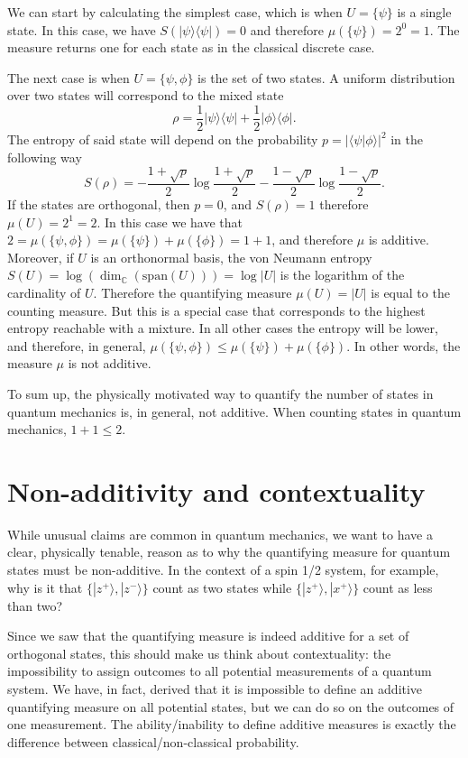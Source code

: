 \documentclass[entropy,article,submit,pdftex,moreauthors]{Definitions/mdpi}
\def\>{\rangle}
\def\<{\langle}
\begin{document}
We can start by calculating the simplest case, which is when $U = \{ \psi \}$ is a single state. In this case, we have $S(|\psi\>\<\psi|) = 0$ and therefore $\mu(\{\psi\}) = 2^{0} = 1$. The measure returns one for each state as in the classical discrete case.

The next case is when $U = \{ \psi, \phi \}$ is the set of two states. A uniform distribution over two states will correspond to the mixed state
\begin{equation}
	\rho = \frac{1}{2} |\psi\>\<\psi| + \frac{1}{2} |\phi\>\<\phi|.
\end{equation}
The entropy of said state will depend on the probability $p=|\<\psi | \phi \>|^2$ in the following way
\begin{equation}
	S(\rho) = - \frac{1+\sqrt{p}}{2} \log \frac{1+\sqrt{p}}{2} 
	- \frac{1-\sqrt{p}}{2} \log \frac{1-\sqrt{p}}{2}.
\end{equation}
If the states are orthogonal, then $p=0$, and $S(\rho) = 1$ therefore $\mu(U) = 2^1 = 2$. In this case we have that $2 = \mu(\{ \psi, \phi \}) = \mu(\{\psi\}) + \mu(\{\phi\}) = 1 + 1$, and therefore $\mu$ is additive. Moreover, if $U$ is an orthonormal basis, the von Neumann entropy $S(U) = \log(\dim_{\mathbb{C}}(\text{span}(U))) = \log |U|$ is the logarithm of the cardinality of $U$. Therefore the quantifying measure $\mu(U) = |U|$ is equal to the counting measure. But this is a special case that corresponds to the highest entropy reachable with a mixture. In all other cases the entropy will be lower, and therefore, in general, $\mu(\{ \psi, \phi \}) \leq \mu(\{\psi\}) + \mu(\{\phi\})$. In other words, the measure $\mu$ is not additive.

To sum up, the physically motivated way to quantify the number of states in quantum mechanics is, in general, not additive. When counting states in quantum mechanics, $1+1 \leq 2$.

\section{Non-additivity and contextuality}

While unusual claims are common in quantum mechanics, we want to have a clear, physically tenable, reason as to why the quantifying measure for quantum states must be non-additive. In the context of a spin 1/2 system, for example, why is it that $\{ |z^+\>, |z^-\>\}$ count as two states while $\{ |z^+\>, |x^+\> \}$ count as less than two?

Since we saw that the quantifying measure is indeed additive for a set of orthogonal states, this should make us think about contextuality: the impossibility to assign outcomes to all potential measurements of a quantum system. We have, in fact, derived that it is impossible to define an additive quantifying measure on all potential states, but we can do so on the outcomes of one measurement. The ability/inability to define additive measures is exactly the difference between classical/non-classical probability.
\end{document}
